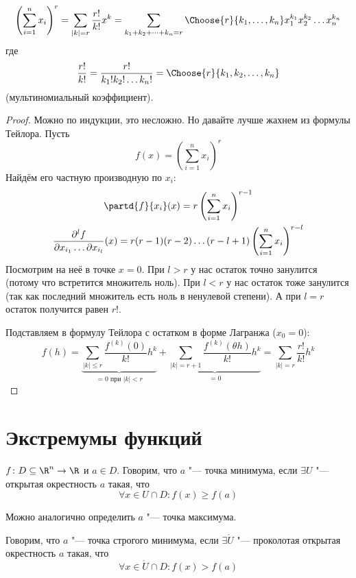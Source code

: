 \begin{theorem}
	\[
		\left(\sum_{i=1}^n x_i\right)^r = \sum_{|k|=r} \frac{r!}{k!} x^k = \sum_{k_1+k_2+\dots+k_n=r}\Choose{r}{k_1, \dots, k_n}
			x_1^{k_1}x_2^{k_2}\dots x_n^{k_n}
	\]
	где
	\[ \frac{r!}{k!} = \frac{r!}{k_1!k_2!\dots k_n!} = \Choose{r}{k_1, k_2, \dots, k_n}\]
	(мультиномиальный коэффициент).
\end{theorem}
\begin{proof}
	Можно по индукции, это несложно.
	Но давайте лучше жахнем из формулы Тейлора.
	Пусть
	\[ f(x)=\left( \sum_{i=1}^n x_i \right)^r \]
	Найдём его частную производную по $x_i$:
	\begin{gather*}
		\partd{f}{x_i} (x) = r \left( \sum_{i=1}^n x_i \right)^{r-1} \\
		\frac{\partial ^ l f}{\partial x_{i_1} \dots \partial x_{i_l}} (x) = r(r-1)(r-2)\dots(r-l+1) \left( \sum_{i=1}^n x_i \right)^{r-l} \\
	\end{gather*}
	Посмотрим на неё в точке $x=0$.
	При $l>r$ у нас остаток точно занулится (потому что встретится множитель ноль).
	При $l<r$ у нас остаток тоже занулится (так как последний множитель есть ноль в ненулевой степени).
	А при $l=r$ остаток получится равен $r!$.

	Подставляем в формулу Тейлора с остатком в форме Лагранжа ($x_0=0$):
	\[
		f(h)
			= \underbrace{\sum_{|k| \le r} \frac{f^{(k)}(0)}{k!} h^k}_{=0\text{~при~}|k|<r}
			+ \underbrace{\sum_{|k|=r+1} \frac{f^{(k)}(\theta h)}{k!} h^k}_{=0}
			= \sum_{|k|=r} \frac{r!}{k!} h^k
	\]
\end{proof}

\section{Экстремумы функций}
\begin{Def}
	$f \colon D \subseteq \R^n \to \R$ и $a \in D$.
	Говорим, что $a$ "--- точка минимума, если $\exists U$ "--- открытая окрестность $a$ такая, что
	\[ \forall x \in U \cap D \colon f(x) \ge f(a) \]
\end{Def}
\begin{Rem}
	Можно аналогично определить $a$ "--- точка максимума.
\end{Rem}
\begin{Def}
	Говорим, что $a$ "--- точка строгого минимума, если $\exists \mathring U$ "--- проколотая открытая окрестность $a$ такая, что
	\[ \forall x \in \mathring U \cap D \colon f(x) > f(a) \]
\end{Def}

